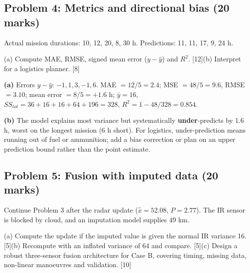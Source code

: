\documentclass[11pt]{article}
\begin{document}
\subsection{Problem 4: Metrics and directional bias \normalfont\small\color{GreyN}(20 marks)}

\begin{prob}Actual mission durations: 10, 12, 20, 8, 30 h. Predictions: 11, 11, 17, 9, 24 h.

(a) Compute MAE, RMSE, signed mean error ($y-\hat y$) and $R^2$. [12]\newline (b) Interpret for a logistics planner. [8]\end{prob}

\begin{soln}\textbf{(a)} Errors $y-\hat y$: $-1, 1, 3, -1, 6$. MAE $=12/5=\mathbf{2.4}$; MSE $=48/5=9.6$, RMSE $=\mathbf{3.10}$; mean error $=8/5=\mathbf{+1.6}$ h; $\bar y=16$, $SS_{tot}=36+16+16+64+196=328$, $R^2=1-48/328=\mathbf{0.854}$.

\textbf{(b)} The model explains most variance but systematically \textbf{under}-predicts by 1.6 h, worst on the longest mission (6 h short). For logistics, under-prediction means running out of fuel or ammunition; add a bias correction or plan on an upper prediction bound rather than the point estimate.\end{soln}

\subsection{Problem 5: Fusion with imputed data \normalfont\small\color{GreyN}(20 marks)}

\begin{prob}Continue Problem 3 after the radar update ($\hat x=52.08$, $P=2.77$). The IR sensor is blocked by cloud, and an imputation model supplies 49 km.

(a) Compute the update if the imputed value is given the normal IR variance 16. [5]\newline (b) Recompute with an inflated variance of 64 and compare. [5]\newline (c) Design a robust three-sensor fusion architecture for Case B, covering timing, missing data, non-linear manoeuvres and validation. [10]\end{prob}
\end{document}
